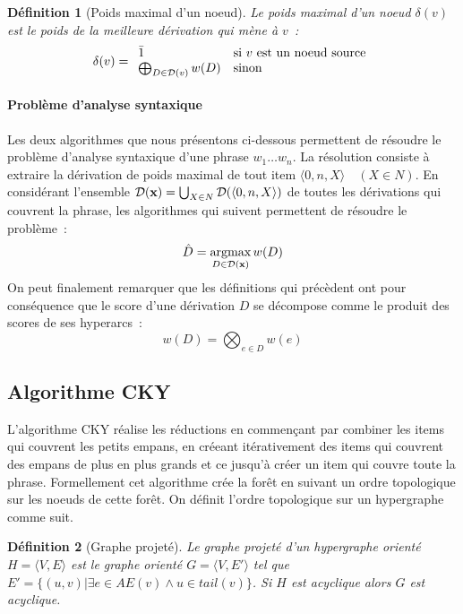 \documentclass[11pt,openany]{book}
\newtheorem{definition}{Définition}[chapter]
\begin{document}
\begin{definition}[Poids maximal d'un noeud]
Le poids maximal d'un noeud $\delta(v)$ est le poids de la meilleure dérivation qui mène à $v$~:
\begin{displaymath}
\delta(v) = 
\begin{array}{ll}
\bar{1} & \text{si $v$ est un noeud source}\\
\bigoplus_{D \in {\cal D}(v)} w(D)&\text{sinon}
\end{array}
\end{displaymath}
\end{definition}


\paragraph{Problème d'analyse syntaxique} 
Les deux algorithmes que nous présentons ci-dessous permettent de
résoudre le problème d'analyse syntaxique d'une phrase $w_1\ldots w_n$.
La résolution consiste à extraire la dérivation de poids maximal de tout item $\langle 0,n , X \rangle \quad (X\in N)$.
En considérant l'ensemble ${\cal D}(\mathbf{x}) = \bigcup_{X \in N} {\cal D} (\langle 0, n, X \rangle) $ de toutes les dérivations qui couvrent la phrase,
les algorithmes qui suivent permettent de résoudre le problème~:
\begin{equation}
\hat{D} = \mathop{\text{argmax}}_{D \in {\cal D}(\mathbf{x})} w(D)
\end{equation}
On peut finalement remarquer que les définitions qui précèdent 
ont pour conséquence que le score d'une dérivation $D$ se décompose comme le produit des scores de ses hyperarcs~:
\begin{equation}
w(D) = \bigotimes_{e\in D} w(e) 
\end{equation}

\subsection{Algorithme CKY}

L'algorithme CKY réalise les réductions en commençant par combiner les items qui couvrent les petits empans, en créeant itérativement des items qui 
couvrent des empans de plus en plus grands et ce jusqu'à créer un item qui couvre toute la phrase.
Formellement cet algorithme crée la forêt en suivant un ordre topologique sur les noeuds de cette forêt.
On définit l'ordre topologique sur un hypergraphe comme suit.

\begin{definition}[Graphe projeté]
Le graphe projeté d'un hypergraphe orienté $H=\langle V, E\rangle$ est le graphe orienté $G=\langle V,E'\rangle$
tel que $E' = \{(u,v) | \exists e \in AE(v) \land u \in tail(v) \}$. Si $H$ est acyclique alors $G$ est acyclique.
\end{definition}
\end{document}
